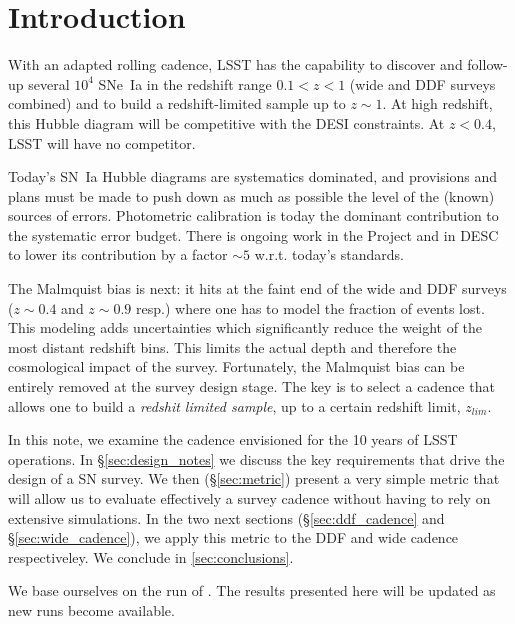 \documentclass[\docopts]{\docclass}
\begin{document}
\section{Introduction}
\label{sec:intro}

With an adapted rolling cadence, LSST has the capability to discover
and follow-up several $10^4$ SNe~Ia in the redshift range $0.1 < z <
1$ (wide and DDF surveys combined) and to build a redshift-limited
sample up to $z \sim 1$. At high redshift, this Hubble diagram will be
competitive with the DESI constraints. At $z < 0.4$, LSST will have no
competitor.

Today's SN~Ia Hubble diagrams are systematics dominated, and
provisions and plans must be made to push down as much as possible the
level of the (known) sources of errors. Photometric calibration is
today the dominant contribution to the systematic error budget.  There
is ongoing work in the Project and in DESC to lower its contribution
by a factor $\sim 5$ w.r.t.  today's standards.

The Malmquist bias is next: it hits at the faint end of the wide and
DDF surveys ($z \sim 0.4$ and $z \sim 0.9$ resp.) where one has to
model the fraction of events lost. This modeling adds uncertainties
which significantly reduce the weight of the most distant redshift
bins.  This limits the actual depth and therefore the cosmological
impact of the survey. Fortunately, the Malmquist bias can be entirely
removed at the survey design stage. The key is to select a cadence
that allows one to build a {\em redshit limited sample}, up to a
certain redshift limit, $z_{lim}$.

In this note, we examine the cadence envisioned for the 10 years of
LSST operations.  In \S\ref{sec:design_notes} we discuss the key
requirements that drive the design of a SN survey.  We then
(\S\ref{sec:metric}) present a very simple metric that will allow us
to evaluate effectively a survey cadence without having to rely on
extensive simulations.  In the two next sections
(\S\ref{sec:ddf_cadence} and \S\ref{sec:wide_cadence}), we apply this
metric to the  DDF and wide cadence respectiveley. We
conclude in \ref{sec:conclusions}.



We base ourselves on the  run of . The
results presented here will be updated as new  runs become
available.



\end{document}
